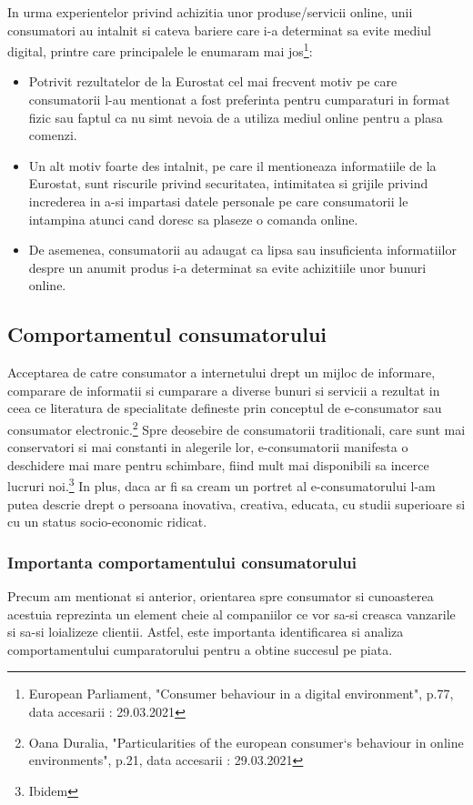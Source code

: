 \documentclass[a4paper, 12pt]{article}
\begin{document}
	\quad In urma experientelor privind achizitia unor produse/servicii online, unii consumatori au intalnit si cateva bariere care i-a determinat sa evite mediul digital, printre care principalele le enumaram mai jos\footnote{European Parliament, "Consumer behaviour in a digital environment", p.77, data accesarii : 29.03.2021}:
	\begin{itemize}
	\item Potrivit rezultatelor de la Eurostat cel mai frecvent motiv pe care consumatorii l-au mentionat a fost preferinta pentru cumparaturi in format fizic sau faptul ca nu simt nevoia de a utiliza mediul online pentru a plasa comenzi.
	\item Un alt motiv foarte des intalnit, pe care il mentioneaza informatiile de la Eurostat, sunt riscurile privind securitatea, intimitatea si grijile privind increderea in a-si impartasi datele personale pe care consumatorii le intampina atunci cand doresc sa plaseze o comanda online.
	\item De asemenea, consumatorii au adaugat ca lipsa sau insuficienta informatiilor despre un anumit produs i-a determinat sa evite achizitiile unor bunuri online.
	\end{itemize}
\newpage
		\subsection{Comportamentul consumatorului}	
		\quad Acceptarea de catre consumator a internetului drept un mijloc de informare, comparare de informatii  si cumparare a diverse bunuri si servicii a rezultat in ceea ce literatura de specialitate defineste prin conceptul de e-consumator sau consumator electronic.\footnote{Oana Duralia, "Particularities of the european consumer`s behaviour in online environments", p.21, data accesarii : 29.03.2021}  Spre deosebire de consumatorii traditionali, care sunt mai conservatori si mai constanti in alegerile lor, e-consumatorii manifesta o deschidere mai mare pentru schimbare, fiind mult mai disponibili sa incerce lucruri noi.\footnote{Ibidem} In plus, daca ar fi sa cream un portret al e-consumatorului l-am putea descrie drept o persoana inovativa, creativa, educata, cu studii superioare si cu un status socio-economic ridicat.
			\subsubsection{Importanta comportamentului consumatorului }
		\quad Precum am mentionat si anterior, orientarea spre consumator si cunoasterea acestuia reprezinta un element cheie al companiilor ce vor sa-si creasca vanzarile si sa-si loializeze clientii. Astfel, este importanta identificarea si analiza comportamentului cumparatorului pentru a obtine succesul pe piata.
		
\end{document}
